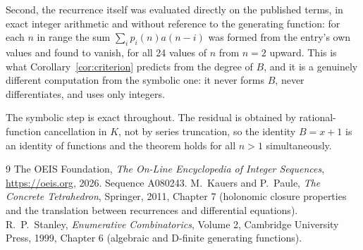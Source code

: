 \documentclass[11pt,a4paper]{article}
\theoremstyle{plain}
\theoremstyle{definition}
\begin{document}
Second, the recurrence itself was evaluated directly on the published terms, in exact
integer arithmetic and without reference to the generating function: for each $n$ in range
the sum $\sum_{i}p_{i}(n)a(n-i)$ was formed from the entry's own values and found to
vanish, for all 24 values of $n$ from $n=2$ upward. This is what
Corollary~\ref{cor:criterion} predicts from the degree of $B$, and it is a genuinely
different computation from the symbolic one: it never forms $B$, never differentiates, and
uses only integers.

The symbolic step is exact throughout. The residual is obtained by rational-function
cancellation in $K$, not by series truncation, so the identity $B=x + 1$ is an
identity of functions and the theorem holds for all $n>1$ simultaneously.

\begin{thebibliography}{9}
 The OEIS Foundation, \emph{The On-Line Encyclopedia of Integer Sequences},
\url{https://oeis.org}, 2026. Sequence A080243.
 M.~Kauers and P.~Paule, \emph{The Concrete Tetrahedron}, Springer, 2011,
Chapter 7 (holonomic closure properties and the translation between recurrences and
differential equations).
 R.~P.~Stanley, \emph{Enumerative Combinatorics}, Volume 2, Cambridge
University Press, 1999, Chapter 6 (algebraic and D-finite generating functions).
\end{thebibliography}
\end{document}
